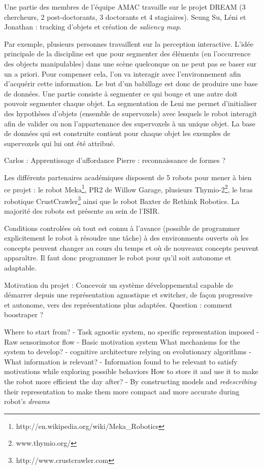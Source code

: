 \documentclass{llncs}
\begin{document}
Une partie des membres de l'équipe AMAC travaille sur le projet DREAM (3 chercheurs, 2 post-doctorants, 3 doctorants et 4 stagiaires).
Seung Su, Léni et Jonathan : tracking d'objets et création de \textit{saliency map}.

Par exemple, plusieurs personnes travaillent sur la perception interactive. L'idée principale de la discipline est que pour segmenter des éléments (en l'occurrence des objects manipulables) dans une scène quelconque on ne peut pas se baser sur un a priori. Pour compenser cela, l'on va interagir avec l'environnement afin d'acquérir cette information. Le but d'un babillage est donc de produire une base de données. Une partie consiste à segmenter ce qui bouge et une autre doit pouvoir segmenter chaque objet. La segmentation de Leni me permet d'initialiser des hypothèses d'objets (ensemble de supervoxels) avec lesquels le robot interagit afin de valider ou non l'appartenance des supervoxels à un unique objet. La base de données qui est construite contient pour chaque objet les exemples de supervoxels qui lui ont été attribué.

Carlos : Apprentissage d'affordance
Pierre : reconnaissance de formes ?

Les différents partenaires académiques disposent de 5 robots pour mener à bien ce projet : le robot Meka\footnote{http://en.wikipedia.org/wiki/Meka\_Robotics}, PR2 de Willow Garage, plusieurs Thymio-2\footnote{www.thymio.org/}, le bras robotique CrustCrawler\footnote{http://www.crustcrawler.com} ainsi que le robot Baxter de Rethink Robotics. La majorité des robots est présente au sein de l'ISIR.

Conditions controlées où tout est connu à l'avance (possible de programmer explicitement le robot à résoudre une tâche) à des environments ouverts où les concepts peuvent changer au cours du temps et où de nouveaux concepts peuvent apparaître. Il faut donc programmer le robot pour qu'il soit autonome et adaptable.

Motivation du projet : Concevoir un système développemental capable de démarrer depuis une représentation agnostique et switcher, de façon progressive et autonome, vers des représentations plus adaptées. Question : comment boostraper ?

Where to start from?
- Task agnostic system, no specific representation imposed
- Raw sensorimotor flow
- Basic motivation system
What mechanisms for the system to develop?
- cognitive architecture relying on evolutionary algorithms
- What information is relevant?
- Information found to be relevant to satisfy motivations while exploring
possible behaviors
How to store it and use it to make the robot more efficient the day after?
- By constructing models and \textit{redescribing} their representation to make
them more compact and more accurate during robot’s \textit{dreams}
\end{document}
